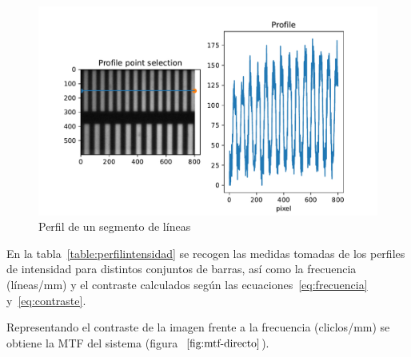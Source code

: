 \documentclass{./packages/optica-article}
\begin{document}
\begin{figure}
	\includegraphics[width=\textwidth]{profile-lines.pdf}
	\caption{Perfil de un segmento de líneas}\label{fig:perfil:example}
\end{figure}

En la tabla~\ref{table:perfilintensidad} se recogen las medidas tomadas de los perfiles de intensidad para distintos conjuntos de barras, así como la frecuencia (líneas/mm) y el contraste calculados según las ecuaciones~\ref{eq:frecuencia} y~\ref{eq:contraste}.

\begin{table}[hbp]
	\centering
	\caption{Datos de los perfiles de intensidad. $y$: intensidad. $x$. El contraste se ha obtenido a partir de la ecuación~\ref{eq:contraste}. La frecuencia se ha obtenido a través de la ecuación~\ref{eq:frecuencia}. Como se obtienen los periodos se explica visualmente en la Fig.~\ref{fig:perfil:example}}%
	\label{table:perfilintensidad}
\end{table}

Representando el contraste de la imagen frente a la frecuencia (cliclos/mm) se obtiene la MTF del sistema (figura $~\ref{fig:mtf-directo}$).
\end{document}
